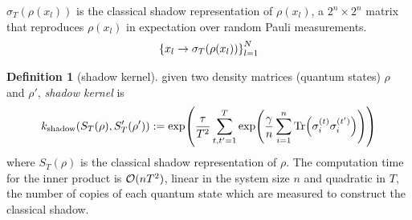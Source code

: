 \documentclass[
10pt,
aps,
pra,
linenumbers,
floatfix,
]{revtex4-2}
\theoremstyle{plain}
\theoremstyle{definition}
\newtheorem{definition}{Definition}
\newcommand{\shadow}{\textup{shadow}}
\newcommand{\dm}{\rho}
\begin{document}
$\sigma_T(\dm(x_l))$ is the classical shadow representation of $\dm(x_l)$, 
a $2^n\times 2^n$ matrix that reproduces $\dm(x_l)$ in expectation over random Pauli measurements.
\begin{equation}
	\qty{x_l\to\sigma_T(\dm(x_l))}_{l=1}^N
\end{equation}
\begin{definition}[shadow kernel]\label{def:shadow_kernel}
	given two density matrices (quantum states) $\rho$ and $\rho'$,
	\emph{shadow kernel} \cite{huangPredictingManyProperties2020} is 
	\begin{equation}
		k_{\shadow}(S_T(\dm),S_T'(\dm')) := 
		\exp( \frac{\tau}{T^2}
			\sum_{t,t'=1}^{T} \exp( \frac{\gamma}{n} 
			\sum_{i=1}^n \Tr(\sigma_i^{(t)}\sigma_i^{(t')}) ) 
			)
	\end{equation}	
	where $S_T(\dm)$ is the classical shadow representation of $\dm$.
	The computation time for the inner product is $\mathcal{O}(nT^2)$,
	linear in the system size $n$ and quadratic in $T$,
	the number of copies of each quantum state which are measured to construct the classical shadow.
\end{definition}
\end{document}
